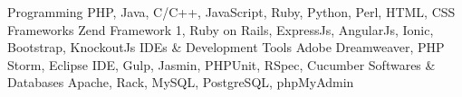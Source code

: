 \begin{cvskills}
  \cvskill
    {Programming}
    {PHP, Java, C/C++, JavaScript, Ruby, Python, Perl, HTML, CSS}
  \cvskill
  {Frameworks}
  {Zend Framework 1, Ruby on Rails, ExpressJs, AngularJs, Ionic, Bootstrap, KnockoutJs}  
  \cvskill
  {IDEs \& Development Tools}
  {Adobe Dreamweaver, PHP Storm, Eclipse IDE, Gulp, Jasmin, PHPUnit, RSpec, Cucumber}  
  \cvskill
  {Softwares \& Databases}
  {Apache, Rack, MySQL, PostgreSQL, phpMyAdmin}      
    
\end{cvskills}
